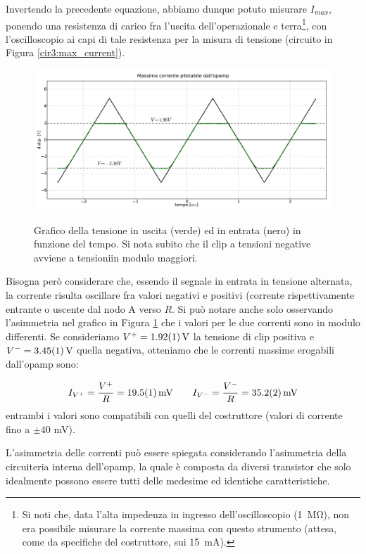 Invertendo la precedente equazione, abbiamo dunque potuto misurare $I_{max}$, ponendo una resistenza di carico fra l'uscita dell'operazionale e terra\footnote{Si noti che, data l'alta impedenza in ingresso dell'oscilloscopio (\SI{1}{\mega\ohm}), non era possibile misurare la corrente massima con questo strumento (attesa, come da specifiche del costruttore, sui \SI{15}{\milli\ampere}).}, con l'oscilloscopio ai capi di tale resistenza per la misura di tensione (circuito in Figura \ref{cir3:max_current}).

\begin{figure}[ht]
 \centering
   {\includegraphics[width=\textwidth]{../E03/latex/clip.pdf}}
 \caption{Grafico della tensione in uscita (verde) ed in entrata (nero) in funzione del tempo. Si nota subito che il clip a tensioni negative avviene a tensioniin modulo maggiori.}
 \label{gr3:clip}
\end{figure}

Bisogna però considerare che, essendo il segnale in entrata in tensione alternata, la corrente risulta oscillare fra valori negativi e positivi (corrente rispettivamente entrante o uscente dal nodo A verso $R$.
Si può notare anche solo osservando l'asimmetria nel grafico in Figura \ref{gr3:clip} che i valori per le due correnti sono in modulo differenti.
Se consideriamo $V^+ = \SI{1.92 \pm 0.01}{\volt}$ la tensione di clip positiva e $V^- = \SI{3.45 \pm 0.01}{\volt}$ quella negativa, otteniamo che le correnti massime erogabili dall'opamp sono:

$$I_{V^+} = \frac{V^+}{R} = \SI{19.5 \pm 0.1}{\milli\volt}  \qquad I_{V^-} = \frac{V^-}{R} = \SI{35.2 \pm 0.2}{\milli\volt}$$
entrambi i valori sono compatibili con quelli del costruttore (valori di corrente fino a $\pm 40$ \si{\milli\volt}).

L'asimmetria delle correnti può essere spiegata considerando l'asimmetria della circuiteria interna dell'opamp, la quale è composta da diversi transistor che solo idealmente possono essere tutti delle medesime ed identiche caratteristiche.

